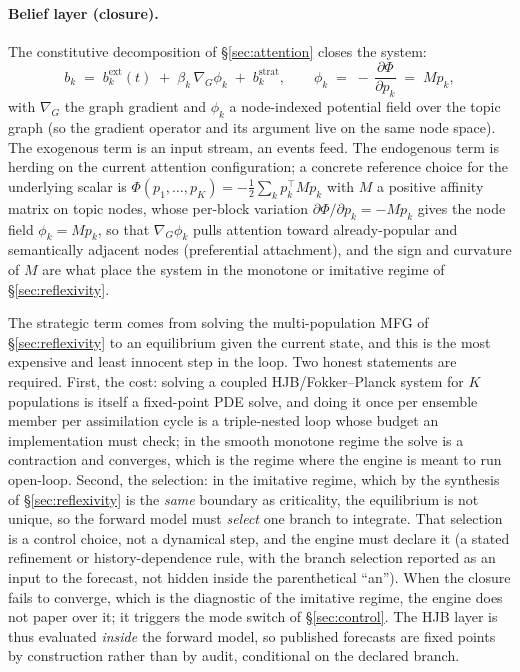 \documentclass[11pt]{article}
\begin{document}
\paragraph{Belief layer (closure).} The constitutive decomposition of \S\ref{sec:attention} closes the system:
\begin{equation}
b_k \;=\; b_k^{\mathrm{ext}}(t) \;+\; \beta_k \,\nabla_G \phi_k \;+\; b_k^{\mathrm{strat}},
\qquad \phi_k \;=\; -\,\frac{\partial \Phi}{\partial p_k} \;=\; M p_k,
\label{eq:closure}
\end{equation}
with $\nabla_G$ the graph gradient and $\phi_k$ a node-indexed potential field over the topic graph (so the gradient operator and its argument live on the same node space). The exogenous term is an input stream, an events feed. The endogenous term is herding on the current attention configuration; a concrete reference choice for the underlying scalar is $\Phi(p_1,\dots,p_K) = -\tfrac{1}{2}\sum_k p_k^\top M p_k$ with $M$ a positive affinity matrix on topic nodes, whose per-block variation $\partial\Phi/\partial p_k = -M p_k$ gives the node field $\phi_k = M p_k$, so that $\nabla_G\phi_k$ pulls attention toward already-popular and semantically adjacent nodes (preferential attachment), and the sign and curvature of $M$ are what place the system in the monotone or imitative regime of \S\ref{sec:reflexivity}.

The strategic term comes from solving the multi-population MFG of \S\ref{sec:reflexivity} to an equilibrium given the current state, and this is the most expensive and least innocent step in the loop. Two honest statements are required. First, the cost: solving a coupled HJB/Fokker--Planck system for $K$ populations is itself a fixed-point PDE solve, and doing it once per ensemble member per assimilation cycle is a triple-nested loop whose budget an implementation must check; in the smooth monotone regime the solve is a contraction and converges, which is the regime where the engine is meant to run open-loop. Second, the selection: in the imitative regime, which by the synthesis of \S\ref{sec:reflexivity} is the \emph{same} boundary as criticality, the equilibrium is not unique, so the forward model must \emph{select} one branch to integrate. That selection is a control choice, not a dynamical step, and the engine must declare it (a stated refinement or history-dependence rule, with the branch selection reported as an input to the forecast, not hidden inside the parenthetical ``an''). When the closure fails to converge, which is the diagnostic of the imitative regime, the engine does not paper over it; it triggers the mode switch of \S\ref{sec:control}. The HJB layer is thus evaluated \emph{inside} the forward model, so published forecasts are fixed points by construction rather than by audit, conditional on the declared branch.
\end{document}
